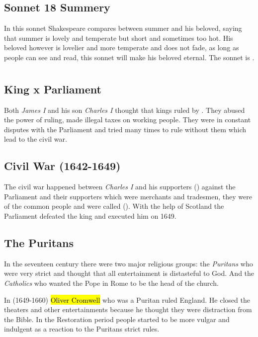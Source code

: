\documentclass[12pt, a4paper]{article}
\begin{document}
\subsection*{Sonnet 18 Summery}
{\fontpar
In this sonnet Shakespeare compares between summer and his beloved, saying that summer is lovely and temperate
but short and sometimes too hot. His beloved however is 
lovelier and more temperate and does not fade, as long as 
people can see and read, this sonnet will make his beloved eternal. The 
sonnet is .
}

\section*{}
{\fontpar
\subsection*{King x Parliament}

Both \textit{James I} and his son \textit{Charles I} thought that kings ruled 
by . They abused the power of ruling, made illegal taxes
on working people. They were in constant disputes with the Parliament and tried 
many times to rule without them which lead to the civil war.

\subsection*{Civil War (1642-1649)}

The civil war happened between \textit{Charles I} and his supporters 
() against the Parliament and their supporters which were
merchants and tradesmen, they were of the common people and were called (). 
With the help of Scotland the Parliament defeated the king and executed him on 1649.

\subsection*{The Puritans}

In the seventeen century there were two major religious groups: the
\textit{Puritans} who were very strict and thought that all entertainment is
distasteful to God. And the \textit{Catholics} who wanted the Pope in Rome to 
be the head of the church.\medbreak

In (1649-1660) \hl{Oliver Cromwell} who was a Puritan ruled England. He closed the 
theaters and other entertainments because he thought they were distraction
from the Bible. In the Restoration period people started to be more vulgar and 
indulgent as a reaction to the Puritans strict rules.


}
\end{document}
